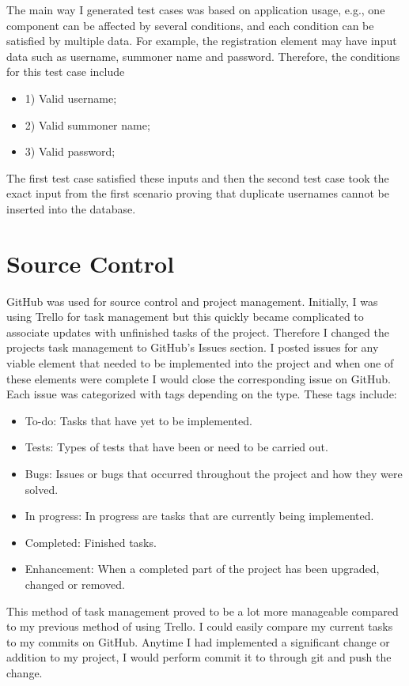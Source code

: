 The main way I generated test cases was based on application usage, e.g., one component can be affected by several conditions, and each condition can be satisfied by multiple data. For example, the registration element may have input data such as username, summoner name and password. Therefore, the conditions for this test case include
\begin{itemize}
	\item 1) Valid username; 
	\item 2) Valid summoner name; 
	\item 3) Valid password;
\end{itemize}
The first test case satisfied these inputs and then the second test case took the exact input from the first scenario proving that duplicate usernames cannot be inserted into the database.

\section{Source Control}
GitHub was used for source control and project management. Initially, I was using Trello for task management but this quickly became complicated to associate updates with unfinished tasks of the project. Therefore I changed the projects task management to GitHub’s Issues section. I posted issues for any viable element that needed to be implemented into the project and when one of these elements were complete I would close the corresponding issue on GitHub. Each issue was categorized with tags depending on the type. These tags include:
\begin{itemize}
	\item To-do: Tasks that have yet to be implemented.
	\item Tests: Types of tests that have been or need to be carried out.
	\item Bugs: Issues or bugs that occurred throughout the project and how they were solved.
	\item In progress: In progress are tasks that are currently being implemented.
	\item Completed: Finished tasks.
	\item Enhancement: When a completed part of the project has been upgraded, changed or removed.
\end{itemize}
This method of task management proved to be a lot more manageable compared to my previous method of using Trello. I could easily compare my current tasks to my commits on GitHub. Anytime I had implemented a significant change or addition to my project, I would perform commit it to through git and push the change.

